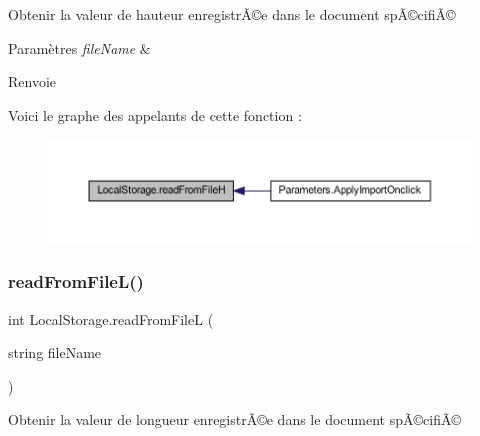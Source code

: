 Obtenir la valeur de hauteur enregistrÃ©e dans le document spÃ©cifiÃ© 


\begin{DoxyParams}{Paramètres}
{\em file\+Name} & \\
\hline
\end{DoxyParams}
\begin{DoxyReturn}{Renvoie}

\end{DoxyReturn}
Voici le graphe des appelants de cette fonction \+:\nopagebreak
\begin{figure}[H]
\begin{center}
\leavevmode
\includegraphics[width=350pt]{class_local_storage_ab0e31baa14b85dc8a8bd21aa1d53ab09_icgraph}
\end{center}
\end{figure}
\mbox{\label{class_local_storage_a2216bc871c8298023f62119bcdf7edb4}} 
\subsubsection{\texorpdfstring{read\+From\+File\+L()}{readFromFileL()}}
{\footnotesize\ttfamily int Local\+Storage.\+read\+From\+FileL (\begin{DoxyParamCaption}\item[{string}]{file\+Name }\end{DoxyParamCaption})\hspace{0.3cm}{\ttfamily [inline]}}



Obtenir la valeur de longueur enregistrÃ©e dans le document spÃ©cifiÃ© 


